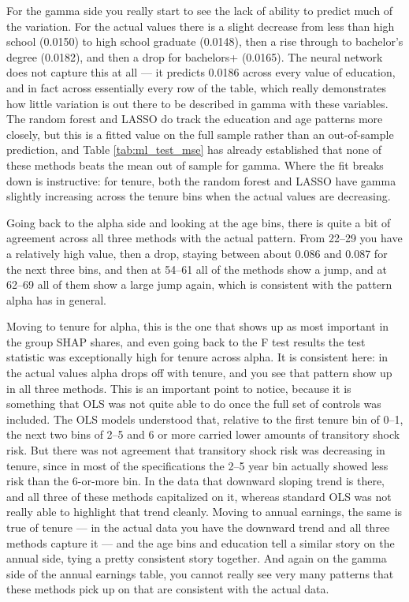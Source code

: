 \documentclass[12pt]{article}
\begin{document}
\begin{onehalfspace}
For the gamma side you really start to see the lack of ability to predict much of the variation. For the actual values there is a slight decrease from less than high school (0.0150) to high school graduate (0.0148), then a rise through to bachelor's degree (0.0182), and then a drop for bachelors+ (0.0165). The neural network does not capture this at all --- it predicts 0.0186 across every value of education, and in fact across essentially every row of the table, which really demonstrates how little variation is out there to be described in gamma with these variables. The random forest and LASSO do track the education and age patterns more closely, but this is a fitted value on the full sample rather than an out-of-sample prediction, and Table \ref{tab:ml_test_mse} has already established that none of these methods beats the mean out of sample for gamma. Where the fit breaks down is instructive: for tenure, both the random forest and LASSO have gamma slightly increasing across the tenure bins when the actual values are decreasing.

Going back to the alpha side and looking at the age bins, there is quite a bit of agreement across all three methods with the actual pattern. From 22--29 you have a relatively high value, then a drop, staying between about 0.086 and 0.087 for the next three bins, and then at 54--61 all of the methods show a jump, and at 62--69 all of them show a large jump again, which is consistent with the pattern alpha has in general.

Moving to tenure for alpha, this is the one that shows up as most important in the group SHAP shares, and even going back to the F test results the test statistic was exceptionally high for tenure across alpha. It is consistent here: in the actual values alpha drops off with tenure, and you see that pattern show up in all three methods. This is an important point to notice, because it is something that OLS was not quite able to do once the full set of controls was included. The OLS models understood that, relative to the first tenure bin of 0--1, the next two bins of 2--5 and 6 or more carried lower amounts of transitory shock risk. But there was not agreement that transitory shock risk was decreasing in tenure, since in most of the specifications the 2--5 year bin actually showed less risk than the 6-or-more bin. In the data that downward sloping trend is there, and all three of these methods capitalized on it, whereas standard OLS was not really able to highlight that trend cleanly. Moving to annual earnings, the same is true of tenure --- in the actual data you have the downward trend and all three methods capture it --- and the age bins and education tell a similar story on the annual side, tying a pretty consistent story together. And again on the gamma side of the annual earnings table, you cannot really see very many patterns that these methods pick up on that are consistent with the actual data.


\end{onehalfspace}
\end{document}
